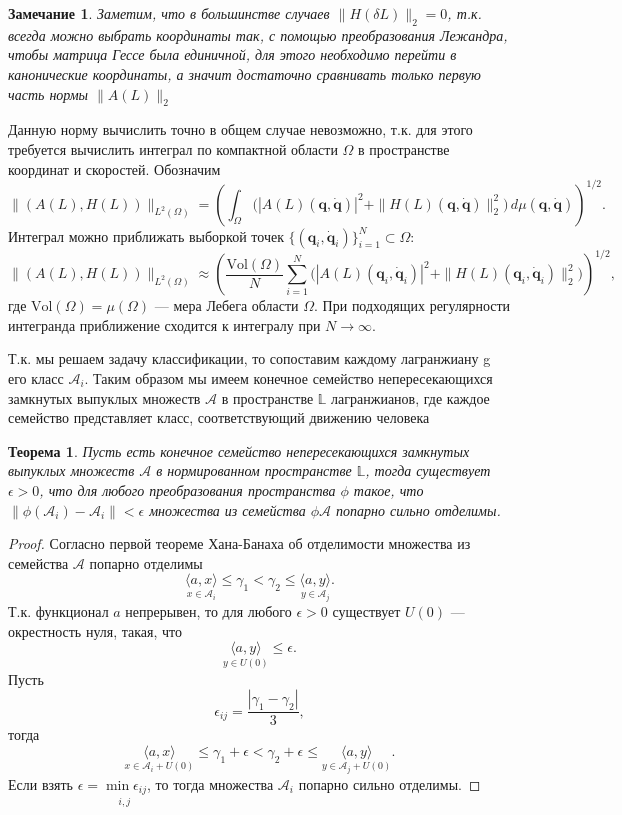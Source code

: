 \documentclass[12pt, twoside]{article}
\newtheorem{remark}{Замечание}
\newtheorem{theorem}{Теорема}
\begin{document}
\begin{remark} \label{remark3}
Заметим, что в большинстве случаев  $\|H(\delta L)\|_2 = 0$, т.к. всегда можно выбрать координаты так, с помощью преобразования Лежандра, чтобы матрица Гессе была единичной, для этого необходимо перейти в канонические координаты, а значит достаточно сравнивать только первую часть нормы $\|A(L)\|_2$
\end{remark}

Данную норму вычислить точно в общем случае невозможно, т.к. для этого требуется вычислить интеграл по компактной области \(\Omega\) в пространстве координат и скоростей. Обозначим
\[
\|(A(L), H(L))\|_{L^2(\Omega)} = \left(\int_{\Omega} \bigl(|A(L)(\mathbf{q},\dot{\mathbf{q}})|^2 + \|H(L)(\mathbf{q},\dot{\mathbf{q}})\|_2^2\bigr)\,d\mu(\mathbf{q},\dot{\mathbf{q}})\right)^{1/2}.
\]
Интеграл можно приближать выборкой точек \(\{(\mathbf{q}_i,\dot{\mathbf{q}}_i)\}_{i=1}^N\subset\Omega\):
\begin{equation}
\|(A(L), H(L))\|_{L^2(\Omega)} \approx \left(\frac{\mathrm{Vol}(\Omega)}{N}\sum_{i=1}^N \bigl(|A(L)(\mathbf{q}_i,\dot{\mathbf{q}}_i)|^2 + \|H(L)(\mathbf{q}_i,\dot{\mathbf{q}}_i)\|_2^2\bigr)\right)^{1/2},
\end{equation}
где \(\mathrm{Vol}(\Omega)=\mu(\Omega)\) — мера Лебега области \(\Omega\). При подходящих регулярности интегранда приближение сходится к интегралу при \(N\to\infty\).

Т.к. мы решаем задачу классификации, то сопоставим каждому лагранжиану g его класс $\mathcal{A}_{i}$. Таким образом мы имеем конечное семейство непересекающихся замкнутых выпуклых множеств $\mathcal{A}$ в пространстве  $\mathbb{L}$ лагранжианов, где каждое семейство представляет класс, соответствующий движению человека

\begin{theorem} \label{main_theorem}
Пусть есть конечное семейство непересекающихся замкнутых выпуклых множеств $\mathcal{A}$ в нормированном пространстве $\mathbb{L}$, тогда существует $\epsilon > 0$, что для любого преобразования пространства $\phi$ такое, что $\|\phi(\mathcal{A}_{i}) - \mathcal{A}_{i}\| < \epsilon$ множества из семейства $\phi{\mathcal{A}}$ попарно сильно отделимы.
\end{theorem}

\begin{proof}
Согласно первой теореме Хана-Банаха об отделимости множества из семейства $\mathcal{A}$ попарно отделимы
\[ 
\underset{x \in \mathcal{A}_{i}}{\langle a, x \rangle}\leq \gamma_{1} < \gamma_{2} \leq \underset{y \in \mathcal{A}_{j}}{\langle a, y \rangle}.
\]
Т.к. функционал $a$ непрерывен, то для любого $\epsilon > 0$ существует $U(0)$ — окрестность нуля, такая, что 
\[
\underset{y \in U(0)}{\langle a, y \rangle} \leq \epsilon.
\]
Пусть 
\[
\epsilon_{ij} = \frac{|\gamma_{1} - \gamma_{2}|}{3},\]
тогда
\[
\underset{x \in \mathcal{A}_{i} + U(0)}{\langle a, x \rangle}\leq \gamma_{1} + \epsilon < \gamma_{2} + \epsilon \leq \underset{y \in \mathcal{A}_{j} + U(0)}{\langle a, y \rangle}.\]
Если взять $\epsilon = \underset{i, j}{\min{\epsilon_{ij}}}$, то тогда множества $\mathcal{A}_{i}$ попарно сильно отделимы. 
\end{proof}
\end{document}
